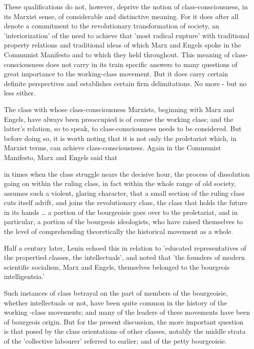 These qualifications do not, however, deprive the notion of class\hyp{}consciousness, in its Marxist sense, of considerable and distinctive meaning. For it does after all denote a commitment to the revolutionary transformation of society, an 'interiorization' of the need to achieve that 'most radical rupture' with traditional property relations and traditional ideas of which Marx and Engels spoke in the Communist Manifesto and to which they held throughout. This meaning of class\hyp{}consciousness does not carry in its train specific answers to many questions of great importance to the working\hyp{}class movement. But it does carry certain definite perspectives and establishes certain firm delimitations. No more - but no less either.

The class with whose class-consciousness Marxists, beginning with Marx and Engels, have always been preoccupied is of course the working class; and the latter's relation, so to speak, to class-consciousness needs to be considered. But before doing so, it is worth noting that it is not only the proletariat which, in Marxist terms, can achieve class-consciousness. Again in the Communist Manifesto, Marx and Engels said that

\begin{displayquote}
    in times when the class struggle nears the decisive hour, the process of dissolution going on within the ruling class, in fact within the whole range of old society, assumes such a violent, glaring character, that a small section of the ruling class cuts itself adrift, and joins the revolutionary class, the class that holds the future in its hands \dots{} a portion of the bourgeoisie goes over to the proletariat, and in particular, a portion of the bourgeois ideologists, who have raised themselves to the level of comprehending theoretically the historical movement as a whole.
\end{displayquote}

Half a century later, Lenin echoed this in relation to 'educated representatives of the propertied classes, the intellectuals', and noted that 'the founders of modern scientific socialism, Marx and Engels, themselves belonged to the bourgeois intelligentsia.'

Such instances of class betrayal on the part of members of the bourgeoisie, whether intellectuals or not, have been quite common in the history of the working -class movements; and many of  the leaders of these movements have been of bourgeois origin. But for the present discussion, the more important question is that posed by the class orientations of other classes, notably the middle strata of the 'collective labourer' referred to earlier; and of the petty bourgeoisie.

